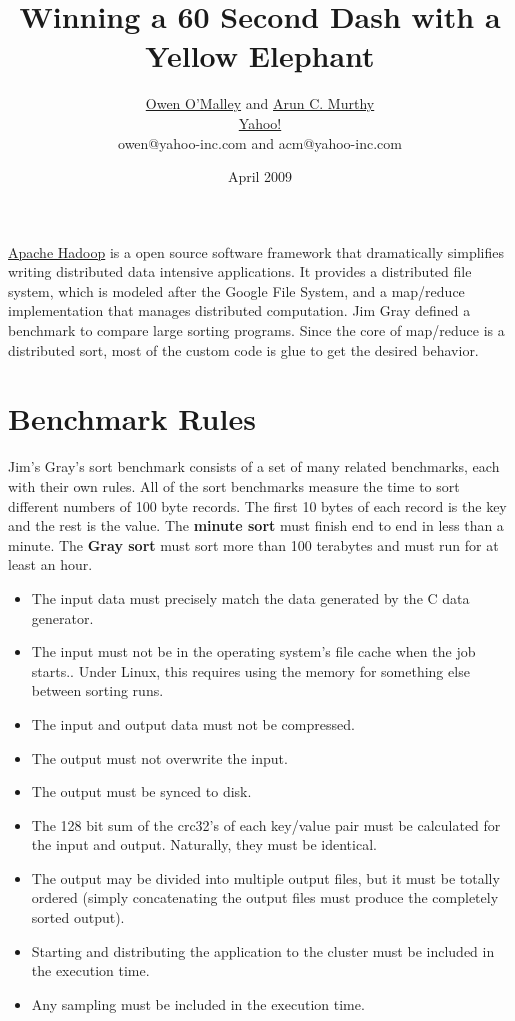 \documentclass{article}
\title{Winning a 60 Second Dash with a Yellow Elephant}
\author{\href{http://people.apache.org/~omalley}{Owen O'Malley} and 
        \href{http://people.apache.org/~acmurthy}{Arun C. Murthy}\\
\href{http://www.yahoo.com/}{Yahoo!}\\
owen@yahoo-inc.com and acm@yahoo-inc.com}
\date{April 2009}
\begin{document}
\maketitle
\href{http://hadoop.apache.org/core}{Apache Hadoop} is a open source
software framework that dramatically simplifies writing distributed
data intensive applications. It provides a distributed file system,
which is modeled after the Google File System\cite{gfs}, and a
map/reduce\cite{mapreduce} implementation that manages distributed
computation. Jim Gray defined a benchmark to compare large sorting
programs. Since the core of map/reduce is a distributed sort, most of
the custom code is glue to get the desired behavior.

\section{Benchmark Rules}

Jim's Gray's sort benchmark consists of a set of many related
benchmarks, each with their own rules. All of the sort benchmarks
measure the time to sort different numbers of 100 byte records. The
first 10 bytes of each record is the key and the rest is the
value. The \textbf{minute sort} must finish end to end in less than a
minute. The \textbf{Gray sort} must sort more than 100 terabytes and
must run for at least an hour.

\begin{itemize}
\item The input data must precisely match the data generated by the C
  data generator.
\item The input must not be in the operating system's file
  cache when the job starts.. Under Linux, this requires using the memory for something
  else between sorting runs.
\item The input and output data must not be compressed.
\item The output must not overwrite the input.
\item The output must be synced to disk.
\item The 128 bit sum of the crc32's of each key/value pair must be
  calculated for the input and output. Naturally, they must be
  identical.
\item The output may be divided into multiple output files, but it
  must be totally ordered (simply concatenating the output files must
  produce the completely sorted output).
\item Starting and distributing the application to the cluster must be
  included in the execution time.
\item Any sampling must be included in the execution time.
\end{itemize}
\end{document}
